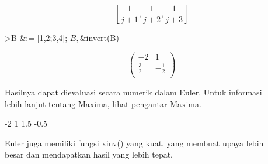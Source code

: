 \documentclass[a4paper,10pt]{article}
\begin{document}
\begin{eulernotebook}
\begin{eulercomment}
\begin{eulercomment}
\begin{eulercomment}
\begin{eulercomment}
\begin{eulerformula}
\[
\left[ \frac{1}{j+1} , \frac{1}{j+2} , \frac{1}{j+3} \right] 
\]
\end{eulerformula}
\begin{eulerprompt}
>B &:= [1,2;3,4]; $B, $&invert(B)
\end{eulerprompt}
\begin{eulerformula}
\[
\begin{pmatrix}-2 & 1 \\ \frac{3}{2} & -\frac{1}{2} \\   \end{pmatrix}
\]
\end{eulerformula}
\begin{eulercomment}
Hasilnya dapat dievaluasi secara numerik dalam Euler. Untuk informasi\\
lebih lanjut tentang Maxima, lihat pengantar Maxima.
\end{eulercomment}
\begin{euleroutput}
             -2             1 
            1.5          -0.5 
\end{euleroutput}
\begin{eulercomment}
Euler juga memiliki fungsi xinv() yang kuat, yang membuat upaya lebih\\
besar dan mendapatkan hasil yang lebih tepat.


\end{eulercomment}
\end{eulercomment}
\end{eulercomment}
\end{eulercomment}
\end{eulercomment}
\end{eulernotebook}
\end{document}
